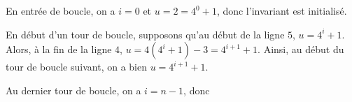 \exer{}
\setcounter{numques}{0}

\question{} En entrée de boucle, on a $i = 0$ et $u = 2 = 4^0+1$, donc l'invariant est initialisé. 

En début d'un tour de boucle, supposons qu'au début de la ligne $5$, $u = 4^i+1$. Alors, à la fin de la ligne $4$, $u = 4(4^i+1)-3 = 4^{i+1}+1$. 
Ainsi, au début du tour de boucle suivant, on a bien $u= 4^{i+1}+1$. 


Au dernier tour de boucle, on a $i=n-1$, donc 
